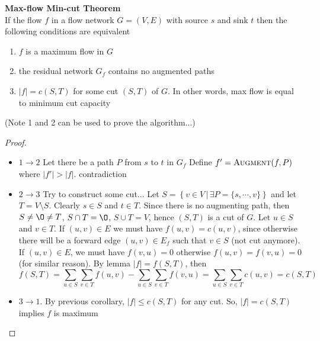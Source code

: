 \documentclass[11pt]{article}
\begin{document}
\begin{theorem*}
  \textbf{Max-flow Min-cut Theorem} \\
  If the flow $f$ in a flow network $G=(V,E)$ with source $s$ and sink $t$ then the following conditions are equivalent
  \begin{enumerate}
    \item $f$ is a maximum flow in $G$
    \item the residual network $G_f$ contains no augmented paths
    \item $|f| = c(S,T)$ for some cut $(S,T)$ of $G$. In other words, max flow is equal to minimum cut capacity
  \end{enumerate}
  (Note 1 and 2 can be used to prove the algorithm...)


  \begin{proof}
    $ $\\
    \begin{itemize}
      \item $1 \to 2$ Let there be a path $P$ from $s$ to $t$ in $G_f$ Define $f' = \textsc{Augment}(f,P)$ where $|f'| > |f|$. contradiction
      \item $2 \to 3$ Try to construct some cut... Let $S = \left\{ v\in V \,|\, \exists P = \{ s,\cdots, v\} \right\}$ and let $T = V\setminus S$. Clearly $s\in S$ and $t\in T$. Since there is no augmenting path, then $S\neq \O \neq T$, $S\cap T = \O$, $S\cup T = V$, hence $(S,T)$ is a cut of $G$. Let $u\in S$ and $v\in T$. If $(u,v)\in E$ we must have $f(u,v) = c(u,v)$, since otherwise there will be a forward edge $(u,v) \in E_f$ such that $v\in S$ (not cut anymore). If $(u,v)\in E$, we must have $f(v, u)  = 0$ otherwise $f(u,v) = f(v,u) = 0$ (for similar reason). By lemma $|f| = f(S,T)$, then
      \[
        f(S,T) = \sum_{u\in S}\sum_{v\in T} f(u,v) -  \sum_{u\in S}\sum_{v\in T} f(v,u) = \sum_{u\in S}\sum_{v\in T} c(u,v) = c(S,T)
      \]
      \item $3 \to 1$. By previous corollary, $|f| \leq c(S,T)$ for any cut. So, $|f| = c(S,T)$ implies $f$ is maximum
    \end{itemize}
  \end{proof}

\end{theorem*}
\end{document}
